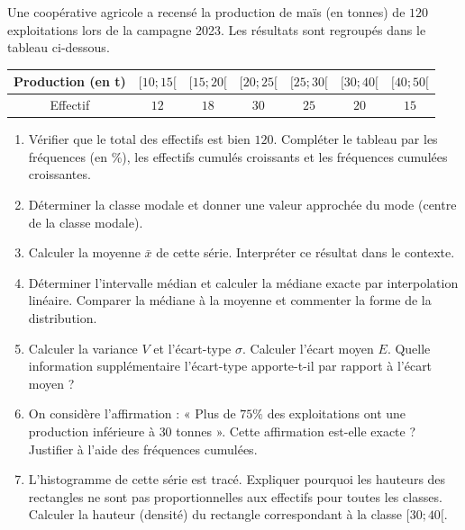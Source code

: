 \documentclass[11pt]{article}
\begin{document}
\begin{exercice}
Une coopérative agricole a recensé la production de maïs (en tonnes) de $120$ exploitations lors de la campagne 2023. Les résultats sont regroupés dans le tableau ci-dessous.

\begin{center}
\begin{tabular}{|c|c|c|c|c|c|c|}
\hline
Production (en t) & $[10; 15[$ & $[15; 20[$ & $[20; 25[$ & $[25; 30[$ & $[30; 40[$ & $[40; 50[$ \\
\hline
Effectif & $12$ & $18$ & $30$ & $25$ & $20$ & $15$ \\
\hline
\end{tabular}
\end{center}

\begin{enumerate}
    \item Vérifier que le total des effectifs est bien $120$. Compléter le tableau par les fréquences (en \%), les effectifs cumulés croissants et les fréquences cumulées croissantes.
    \item Déterminer la classe modale et donner une valeur approchée du mode (centre de la classe modale).
    \item Calculer la moyenne $\bar{x}$ de cette série. Interpréter ce résultat dans le contexte.
    \item Déterminer l'intervalle médian et calculer la médiane exacte par interpolation linéaire. Comparer la médiane à la moyenne et commenter la forme de la distribution.
    \item Calculer la variance $V$ et l'écart-type $\sigma$. Calculer l'écart moyen $E$. Quelle information supplémentaire l'écart-type apporte-t-il par rapport à l'écart moyen ?
    \item On considère l'affirmation : « Plus de $75\%$ des exploitations ont une production inférieure à $30$ tonnes ». Cette affirmation est-elle exacte ? Justifier à l'aide des fréquences cumulées.
    \item L'histogramme de cette série est tracé. Expliquer pourquoi les hauteurs des rectangles ne sont pas proportionnelles aux effectifs pour toutes les classes. Calculer la hauteur (densité) du rectangle correspondant à la classe $[30; 40[$.
\end{enumerate}
\end{exercice}
\end{document}
